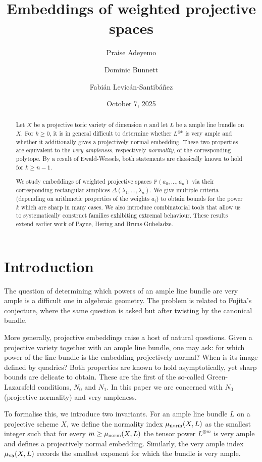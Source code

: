 \documentclass[a4paper,11pt]{amsart}
\title{Embeddings of weighted projective spaces}
\author{Praise Adeyemo}
\author{Dominic Bunnett}
\author{Fabián Levicán-Santibáñez}
\date{October 7, 2025}
\theoremstyle{plain}
\theoremstyle{definition}
\theoremstyle{remark}
\DeclareMathOperator{\munorm}{\mu_{\text norm}}
\DeclareMathOperator{\muva}{\mu_{\text va}}
\begin{document}
\begin{abstract}
    Let $X$ be a projective toric variety of dimension $n$ and let $L$ be a ample line bundle on $X$.
    For $k \geq 0$, it is in general difficult to determine whether $L^{\otimes k}$ is very ample and whether it additionally gives a projectively normal embedding.
    These two properties are equivalent to the \emph{very ampleness}, respectively \emph{normality}, of the corresponding polytope. By a result of Ewald-Wessels, both statements are classically known to hold for $k \geq n - 1$.

    We study embeddings of weighted projective spaces $\mathbb{P}(a_0, \ldots, a_n)$ via their corresponding rectangular simplices $\Delta(\lambda_1, \ldots, \lambda_n)$.
    We give multiple criteria (depending on arithmetic properties of the weights $a_i$) to obtain bounds for the power $k$ which are sharp in many cases.
    We also introduce combinatorial tools that allow us to systematically construct families exhibiting extremal behaviour.
    These results extend earlier work of Payne, Hering and Bruns-Gubeladze.
\end{abstract}

\maketitle

\tableofcontents

\section{Introduction}

The question of determining which powers of an ample line bundle are very ample is a difficult one in algebraic geometry.
The problem is related to Fujita’s conjecture, where the same question is asked but after twisting by the canonical bundle.

More generally, projective embeddings raise a host of natural questions.
Given a projective variety together with an ample line bundle, one may ask: for which power of the line bundle is the embedding  projectively normal?
When is its image defined by quadrics?
Both properties are known to hold asymptotically, yet sharp bounds are delicate to obtain.
These are the first of the so-called Green-Lazarsfeld conditions, $N_0$ and $N_1$.
In this paper we are concerned with $N_0$ (projective normality) and very ampleness.

To formalise this, we introduce two invariants.
For an ample line bundle $L$ on a projective scheme $X$, we define the normality index $\munorm(X,L)$ as the smallest integer such that for every $m\geq \munorm(X,L)$ the tensor power $L^{\otimes m}$ is very ample and defines a projectively normal embedding.
Similarly, the very ample index $\muva(X,L)$ records the smallest exponent for which the bundle is very ample.
\end{document}
